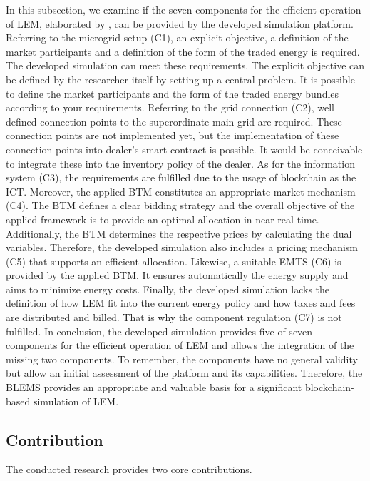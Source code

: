 In this subsection, we examine if the seven components for the efficient operation of LEM,
elaborated by , can be 
provided by the developed simulation platform.
Referring to the microgrid setup (C1), an explicit objective, a definition of the market participants and a definition of the form of the traded energy is required. The developed simulation can meet these requirements. The explicit objective can be defined by the researcher itself by setting up a central problem. It is possible to define the market participants and the form of the traded energy bundles
according to your requirements.
Referring to the grid connection (C2), well defined connection points to the superordinate main grid are required.
These connection points are not implemented yet, but the implementation of these connection points 
into dealer's smart contract is possible.
It would be conceivable to integrate these into the inventory policy of the dealer.
As for the information system (C3), the requirements are fulfilled due to the usage of blockchain as the ICT.
Moreover, the applied BTM constitutes an appropriate market mechanism (C4). The BTM defines a clear bidding strategy and the 
overall objective of the applied framework is to provide an optimal allocation in near real-time. 
Additionally, the BTM determines the respective prices by calculating the dual variables.
Therefore, the developed simulation also includes a pricing mechanism (C5) that supports an efficient allocation.
Likewise, a suitable EMTS (C6) is provided by the applied BTM. 
It ensures automatically the energy supply and aims to minimize energy costs.
Finally, the developed simulation lacks the definition of how LEM fit into the current energy policy and how taxes and fees are distributed and billed. 
That is why the component regulation (C7) is not fulfilled. 
In conclusion, the developed simulation provides five of seven components for the efficient operation of LEM
and allows the integration of the missing two components.
To remember, the components have no general validity but allow an initial assessment of the platform and its capabilities.
Therefore, the BLEMS provides an appropriate and valuable basis for a significant blockchain-based simulation of LEM. 

\subsection{Contribution}
The conducted research provides two core contributions.

